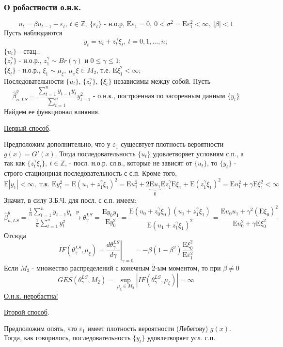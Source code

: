 \documentclass[12pt]{article}
\def\eps{ \varepsilon }
\def\Z{ \mathbb{Z} }
\def\E{ \mathrm{E} }
\def\P{ \mathrm{P} }
\begin{document}
\subsubsection*{О робастности о.н.к.}
\begin{equation*}
    u_t=\beta u_{t-1}+\eps_t,\ t\in\Z,\ \{\eps_t\}\text{ - н.о.р, }\E\eps_1=0,\ 0<\sigma^2=\E\eps_1^2<\infty,\ \left\lvert \beta\right\rvert <1
\end{equation*}
Пусть наблюдаются
\[y_t=u_t+z_t^\gamma\xi_t,\ t=0,1,\ldots,n;\]
$\{u_t\}$ - стац.; \\
$\{z_t^\gamma\}$ - н.о.р., $z_1^\gamma\sim Br(\gamma)$ и $0\leq\gamma\leq1$; \\
$\{\xi_t\}$ - н.о.р., $\xi_1\sim\mu_\xi,\ \mu_x\xi\in M_2$, т.е. $\E\xi_1^2<\infty$; \\
Последовательности $\{u_t\}$, $\{z_t^\gamma\}$, $\{\xi_t\}$ независимы между собой.
Пусть
\[\widehat{\beta}_{n,LS}^y=\frac{\sum_{t=1}^ny_{t-1}y_t}{\sum_{t=1}^n}y_{t-1}^2\text{ - о.н.к., построенная по засоренным данным $\{y_t\}$}\]
Найдем ее функционал влияния.

\underline{Первый способ}.

Предположим дополнительно, что у $\eps_1$ сущесвтует плотность вероятности
$g(x)=G'(x)$. Тогда последовательность $\{u_t\}$ удовлетворяет условиям с.п.,
а так как $\{z_t^\gamma\xi_t\},\ t\in\Z$, - посл. н.о.р. сл.в., которые не зависят от $\{u_t\}$,
то $\{y_t\}$ - строго стационрная последовательность с с.п. Кроме того,
\[\E\left\lvert y_1\right\rvert <\infty,\text{ т.к. } \E y_1^2=\E(u_1+z_1^\gamma\xi_1)^2=\E u_1^2+2\underbrace{\E u_1}_0\E z_1^\gamma\E\xi_1+\E(z_1^\gamma\xi_1)^2=\E u_1^2+\gamma\E\xi_1^2<\infty \]
Значит, в силу З.Б.Ч. для посл. с с.п. имеем:
\[\widehat{\beta}^y_{n,LS}=\frac{\frac{1}{n}\sum_{t=1}^ny_{t-1}y_t}{\frac{1}{n}\sum_{t=1}^ny_t^2}\xrightarrow{\P}\theta_\gamma^{LS}=\frac{\E y_0y_1}{\E y_0^2}=\frac{\E(u_0+z_0^\gamma\xi_0)(u_1+z_1^\gamma\xi_1)}{\E(u_1+z_1^\gamma\xi_1)^2}=\frac{\E u_0u_1+\gamma^2(\E\xi_0)^2}{\E u_0^2+\gamma\E\xi_0^2}\]
Отсюда
\[IF(\theta_\gamma^{LS},\mu_\xi)=\left.\frac{d\theta_\gamma^{LS}}{d\gamma}\right\rvert_{\gamma=0}=-\beta(1-\beta^2)\frac{\E\xi_0^2}{\E\eps_1^2}\]
Если $M_2$ - множество распределений с конечным 2-ым моментом, то при $\beta\neq0$
\[GES(\theta_\gamma^{LS},M_2)=\sup_{\mu_\xi\in M_2}\left\lvert IF(\theta_\gamma^{LS},\mu_\xi)\right\rvert =\infty\]
\underline{О.н.к. неробастна!}

\underline{Второй способ}.

Предположим опять, что $\eps_1$ имеет плотность вероятности (Лебегову) $g(x)$.
Тогда, как говорилось, последовательность $\{y_t\}$ удовлетворяет усл. с.п.
\end{document}
